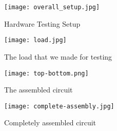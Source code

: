 \begin{figure}[H]
    \centering
    \texttt{[image: overall\_setup.jpg]}
    \caption{Hardware Testing Setup}
    \label{fig:overall_setup}
\end{figure}

\begin{figure}[H]
    \centering
    \texttt{[image: load.jpg]}
    \caption{The load that we made for testing}
    \label{fig:load}
\end{figure}

\begin{figure}[H]
    \centering
    \texttt{[image: top-bottom.png]}
    \caption{The assembled circuit}
    \label{fig:top-bottom}
\end{figure}

\begin{figure}[H]
    \centering
    \texttt{[image: complete-assembly.jpg]}
    \caption{Completely assembled circuit}
    \label{fig:complete-assembly}
\end{figure}

